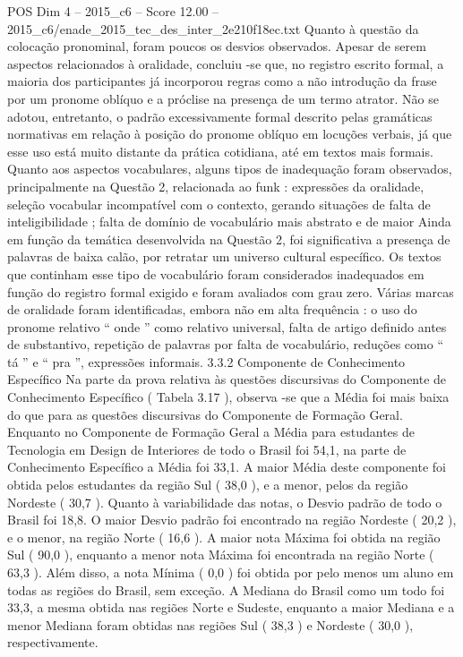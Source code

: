 \begin{textsample}{POS Dim 4 – 2015\_c6 – Score 12.00 – 2015\_c6/enade\_2015\_tec\_des\_inter\_2e210f18ec.txt}
Quanto à questão da colocação pronominal, foram poucos os desvios observados.
Apesar de serem aspectos relacionados à oralidade, concluiu -se que, no registro escrito formal, a maioria dos participantes já incorporou regras como a não introdução da frase por um pronome oblíquo e a próclise na presença de um termo atrator.
Não se adotou, entretanto, o padrão excessivamente formal descrito pelas gramáticas normativas em relação à posição do pronome oblíquo em locuções verbais, já que esse uso está muito distante da prática cotidiana, até em textos mais formais.
Quanto aos aspectos vocabulares, alguns tipos de inadequação foram observados, principalmente na Questão 2, relacionada ao funk : expressões da oralidade, seleção vocabular incompatível com o contexto, gerando situações de falta de inteligibilidade ; falta de domínio de vocabulário mais abstrato e de maior Ainda em função da temática desenvolvida na Questão 2, foi significativa a presença de palavras de baixa calão, por retratar um universo cultural específico.
Os textos que continham esse tipo de vocabulário foram considerados inadequados em função do registro formal exigido e foram avaliados com grau zero.
Várias marcas de oralidade foram identificadas, embora não em alta frequência : o uso do pronome relativo “ onde ” como relativo universal, falta de artigo definido antes de substantivo, repetição de palavras por falta de vocabulário, reduções como “ tá ” e “ pra ”, expressões informais. 3.3.2 Componente de Conhecimento Específico Na parte da prova relativa às questões discursivas do Componente de Conhecimento Específico ( Tabela 3.17 ), observa -se que a Média foi mais baixa do que para as questões discursivas do Componente de Formação Geral.
Enquanto no Componente de Formação Geral a Média para estudantes de Tecnologia em Design de Interiores de todo o Brasil foi 54,1, na parte de Conhecimento Específico a Média foi 33,1.
A maior Média deste componente foi obtida pelos estudantes da região Sul ( 38,0 ), e a menor, pelos da região Nordeste ( 30,7 ).
Quanto à variabilidade das notas, o Desvio padrão de todo o Brasil foi 18,8.
O maior Desvio padrão foi encontrado na região Nordeste ( 20,2 ), e o menor, na região Norte ( 16,6 ).
A maior nota Máxima foi obtida na região Sul ( 90,0 ), enquanto a menor nota Máxima foi encontrada na região Norte ( 63,3 ).
Além disso, a nota Mínima ( 0,0 ) foi obtida por pelo menos um aluno em todas as regiões do Brasil, sem exceção.
A Mediana do Brasil como um todo foi 33,3, a mesma obtida nas regiões Norte e Sudeste, enquanto a maior Mediana e a menor Mediana foram obtidas nas regiões Sul ( 38,3 ) e Nordeste ( 30,0 ), respectivamente.

\end{textsample}

